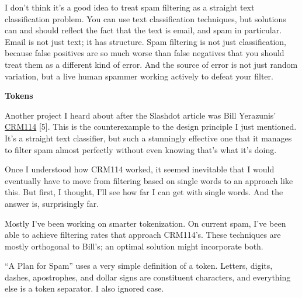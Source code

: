 I don't think it's
                  a good idea to treat spam filtering as a straight text
                  classification problem. You can use text classification
                  techniques, but solutions can and should reflect the fact that
                  the text is email, and spam in particular. Email is not just
                  text; it has structure. Spam filtering is not just
                  classification, because false positives are so much worse than
                  false negatives that you should treat them as a different kind
                  of error. And the source of error is not just random
                  variation, but a live human spammer working actively to defeat
                  your filter.

\textbf{Tokens}

Another
                  project I heard about after the Slashdot article was Bill
                  Yerazunis'
                  \href{http://crm114.sourceforge.net}{CRM114} [5]. This
                  is the counterexample to the design principle I just
                  mentioned. It's a straight text classifier, but such a
                  stunningly effective one that it manages to filter spam almost
                  perfectly without even knowing that's what it's doing.

Once
                  I understood how CRM114 worked, it seemed inevitable that I
                  would eventually have to move from filtering based on single
                  words to an approach like this. But first, I thought, I'll see
                  how far I can get with single words. And the answer is,
                  surprisingly far.

Mostly I've been working on
                  smarter tokenization. On current spam, I've been able to
                  achieve filtering rates that approach CRM114's. These
                  techniques are mostly orthogonal to Bill's; an optimal
                  solution might incorporate both.

``A Plan for
                  Spam'' uses a very simple definition of a token. Letters,
                  digits, dashes, apostrophes, and dollar signs are constituent
                  characters, and everything else is a token separator. I also
                  ignored case.

